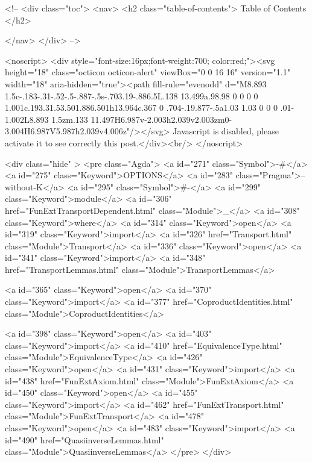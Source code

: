   <!-- 
  <div class="toc">
    <nav>
    <h2 class="table-of-contents"> Table of Contents </h2>
      

    </nav>
  </div>
   -->

  <noscript>
  <div style="font-size:16px;font-weight:700; color:red;"><svg height="18" class="octicon octicon-alert" viewBox="0 0 16 16" version="1.1" width="18" aria-hidden="true"><path fill-rule="evenodd" d="M8.893 1.5c-.183-.31-.52-.5-.887-.5s-.703.19-.886.5L.138 13.499a.98.98 0 0 0 0 1.001c.193.31.53.501.886.501h13.964c.367 0 .704-.19.877-.5a1.03 1.03 0 0 0 .01-1.002L8.893 1.5zm.133 11.497H6.987v-2.003h2.039v2.003zm0-3.004H6.987V5.987h2.039v4.006z"/></svg> Javascript is disabled, please activate it to see correctly this post.</div><br/>
  </noscript>

  <div class="hide" >
<pre class="Agda">
<a id="271" class="Symbol">{-#</a> <a id="275" class="Keyword">OPTIONS</a> <a id="283" class="Pragma">--without-K</a> <a id="295" class="Symbol">#-}</a>
<a id="299" class="Keyword">module</a> <a id="306" href="FunExtTransportDependent.html" class="Module">_</a> <a id="308" class="Keyword">where</a>
<a id="314" class="Keyword">open</a> <a id="319" class="Keyword">import</a> <a id="326" href="Transport.html" class="Module">Transport</a>
<a id="336" class="Keyword">open</a> <a id="341" class="Keyword">import</a> <a id="348" href="TransportLemmas.html" class="Module">TransportLemmas</a>

<a id="365" class="Keyword">open</a> <a id="370" class="Keyword">import</a> <a id="377" href="CoproductIdentities.html" class="Module">CoproductIdentities</a>

<a id="398" class="Keyword">open</a> <a id="403" class="Keyword">import</a> <a id="410" href="EquivalenceType.html" class="Module">EquivalenceType</a>
<a id="426" class="Keyword">open</a> <a id="431" class="Keyword">import</a> <a id="438" href="FunExtAxiom.html" class="Module">FunExtAxiom</a>
<a id="450" class="Keyword">open</a> <a id="455" class="Keyword">import</a> <a id="462" href="FunExtTransport.html" class="Module">FunExtTransport</a>
<a id="478" class="Keyword">open</a> <a id="483" class="Keyword">import</a> <a id="490" href="QuasiinverseLemmas.html" class="Module">QuasiinverseLemmas</a>
</pre>
</div>

